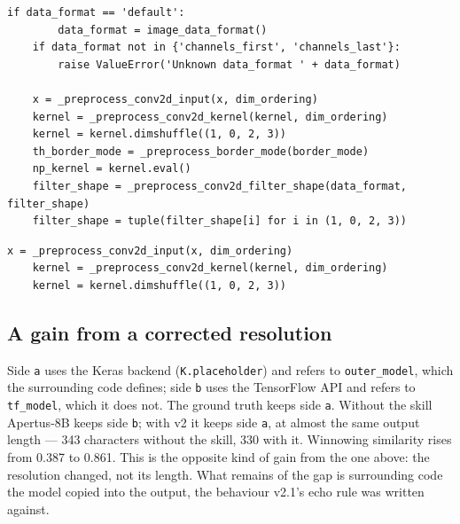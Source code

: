 \begin{lstlisting}[style=conflictcode,title={\textbf{Apertus-8B, without the skill} --- edit 0.320, winnowing 0.538, 583 characters}]
if data_format == 'default':
        data_format = image_data_format()
    if data_format not in {'channels_first', 'channels_last'}:
        raise ValueError('Unknown data_format ' + data_format)

    x = _preprocess_conv2d_input(x, dim_ordering)
    kernel = _preprocess_conv2d_kernel(kernel, dim_ordering)
    kernel = kernel.dimshuffle((1, 0, 2, 3))
    th_border_mode = _preprocess_border_mode(border_mode)
    np_kernel = kernel.eval()
    filter_shape = _preprocess_conv2d_filter_shape(data_format, filter_shape)
    filter_shape = tuple(filter_shape[i] for i in (1, 0, 2, 3))
\end{lstlisting}

\begin{lstlisting}[style=conflictcode,title={\textbf{Apertus-8B, with v2 in the system prompt} --- edit 0.454, winnowing 0.539, 151 characters}]
x = _preprocess_conv2d_input(x, dim_ordering)
    kernel = _preprocess_conv2d_kernel(kernel, dim_ordering)
    kernel = kernel.dimshuffle((1, 0, 2, 3))
\end{lstlisting}


\subsection{A gain from a corrected resolution}

Side \texttt{a} uses the Keras backend (\texttt{K.placeholder}) and refers to
\texttt{outer\_model}, which the surrounding code defines; side \texttt{b} uses the
TensorFlow API and refers to \texttt{tf\_model}, which it does not. The ground
truth keeps side \texttt{a}. Without the skill Apertus-8B keeps side \texttt{b};
with v2 it keeps side \texttt{a}, at almost the same output length --- 343
characters without the skill, 330 with it. Winnowing similarity rises from 0.387
to 0.861. This is the opposite kind of gain from the one above: the resolution
changed, not its length. What remains of the gap is surrounding code the model
copied into the output, the behaviour v2.1's echo rule was written against.

%

